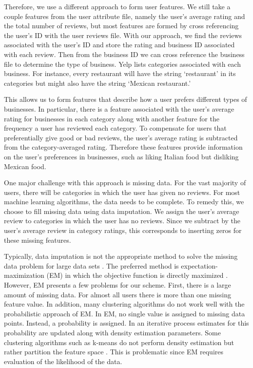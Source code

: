 \documentclass[11pt]{article}
\begin{document}
Therefore, we use a different approach to form user features. We still take a couple features from the user attribute file, namely the user's average rating and the total number of reviews, but most features are formed by cross referencing the user's ID with the user reviews file. With our approach, we find the reviews associated with the user's ID and store the rating and business ID associated with each review. Then from the business ID we can cross reference the business file to determine the type of business.  Yelp lists categories associated with each business. For instance, every restaurant will have the string `restaurant' in its categories but might also have the string `Mexican restaurant.'

This allows us to form features that describe how a user prefers different types of businesses. In particular, there is a feature associated with the user's average rating for businesses in each category along with another feature for the frequency a user has reviewed each category. To compensate for users that preferentially give good or bad reviews, the user's average rating is subtracted from the category-averaged rating. Therefore these features provide information on the user's preferences in businesses, such as liking Italian food but disliking Mexican food.

One major challenge with this approach is missing data. For the vast majority of users, there will be categories in which the user has given no reviews. For most machine learning algorithms, the data needs to be complete. To remedy this, we choose to fill missing data using data imputation. We assign the user's average review to categories in which the user has no reviews. Since we subtract by the user's average review in category ratings, this corresponds to inserting zeros for these missing features. 

Typically, data imputation is not the appropriate method to solve the missing data problem for large data sets \cite{em_vs_im}. The preferred method is expectation-maximization (EM) in which the objective function is directly maximized \cite{em}. However, EM presents a few problems for our scheme. First, there is a large amount of missing data. For almost all users there is more than one missing feature value. In addition, many clustering algorithms do not work well with the probabilistic approach of EM. In EM, no single value is assigned to missing data points. Instead, a probability is assigned. In an iterative process estimates for this probability are updated along with density estimation parameters. Some clustering algorithms such as k-means do not perform density estimation but rather partition the feature space \cite{kmeans}. This is problematic since EM requires evaluation of the likelihood of the data.
\end{document}
